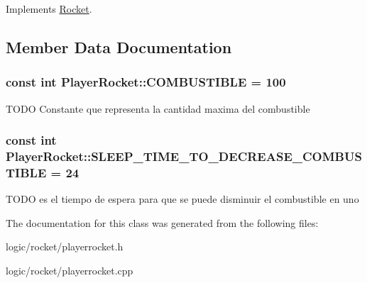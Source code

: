 Implements \hyperlink{class_rocket_a5164f5926f96291b57da2516d46262e8}{Rocket}.



\subsection{Member Data Documentation}
\hypertarget{class_player_rocket_a6f6bd540c91552c079a394e34d25f2c8}{
\subsubsection[{C\-O\-M\-B\-U\-S\-T\-I\-B\-L\-E}]{\setlength{\rightskip}{0pt plus 5cm}const int Player\-Rocket\-::\-C\-O\-M\-B\-U\-S\-T\-I\-B\-L\-E = 100\hspace{0.3cm}{\ttfamily [static]}}}\label{class_player_rocket_a6f6bd540c91552c079a394e34d25f2c8}
T\-O\-D\-O Constante que representa la cantidad maxima del combustible \hypertarget{class_player_rocket_aa3f048b7f984ee944f8daeb35cc748c2}{
\subsubsection[{S\-L\-E\-E\-P\-\_\-\-T\-I\-M\-E\-\_\-\-T\-O\-\_\-\-D\-E\-C\-R\-E\-A\-S\-E\-\_\-\-C\-O\-M\-B\-U\-S\-T\-I\-B\-L\-E}]{\setlength{\rightskip}{0pt plus 5cm}const int Player\-Rocket\-::\-S\-L\-E\-E\-P\-\_\-\-T\-I\-M\-E\-\_\-\-T\-O\-\_\-\-D\-E\-C\-R\-E\-A\-S\-E\-\_\-\-C\-O\-M\-B\-U\-S\-T\-I\-B\-L\-E = 24\hspace{0.3cm}{\ttfamily [static]}}}\label{class_player_rocket_aa3f048b7f984ee944f8daeb35cc748c2}
T\-O\-D\-O es el tiempo de espera para que se puede disminuir el combustible en uno 

The documentation for this class was generated from the following files\-:\begin{DoxyCompactItemize}
\item 
logic/rocket/playerrocket.\-h\item 
logic/rocket/playerrocket.\-cpp\end{DoxyCompactItemize}
